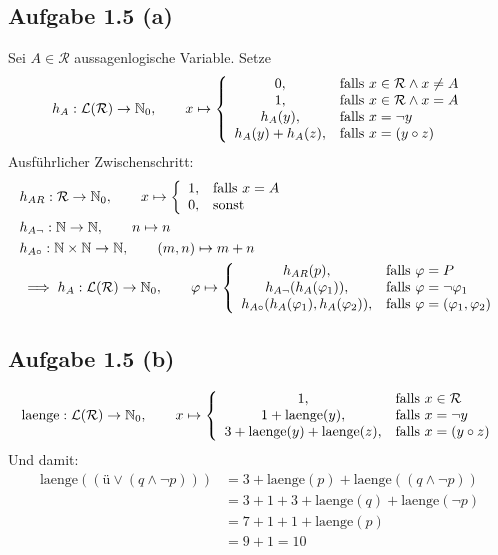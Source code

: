 \documentclass[12pt,a4paper]{article}
\begin{document}
\subsection*{Aufgabe 1.5 (a)}
Sei $A\in\mathcal{R}$ aussagenlogische Variable. Setze
\begin{align*}
h_A:\mathcal{L}(\mathcal{R})\to\mathbb{N}_0,\qquad x\mapsto \left\lbrace\begin{array}{cl}
0, & \text{falls } x\in\mathcal{R}\wedge x\neq A\\
1, & \text{falls } x\in\mathcal{R}\wedge x=A\\
h_A(y), & \text{falls } x=\neg y\\
h_A(y)+h_A(z), & \text{falls } x=(y\circ z)
\end{array}\right.
\end{align*}
Ausführlicher Zwischenschritt:
\begin{align*}
&h_{AR}:\mathcal{R}\to\mathbb{N}_0,\qquad x\mapsto \left\lbrace\begin{array}{cl}
1, & \text{falls } x= A\\
0, & \text{sonst }
\end{array}\right.\\
&h_{A\neg}:\mathbb{N}\to\mathbb{N},\qquad n\mapsto n\\
&h_{A\circ}:\mathbb{N}\times\mathbb{N}\to\mathbb{N},\qquad(m,n)\mapsto m+n\\
&\implies h_A:\mathcal{L}(\mathcal{R})\to\mathbb{N}_0,\qquad\varphi\mapsto
\left\lbrace\begin{array}{cl}
h_{AR}(p), & \text{falls } \varphi=P\\
h_{A\neg}(h_A(\varphi_1)), & \text{falls } \varphi=\neg\varphi_1\\
h_{A\circ}(h_A(\varphi_1),h_A(\varphi_2)), &\text{falls } \varphi=(\varphi_1,\varphi_2)
\end{array}\right.
\end{align*}

\subsection*{Aufgabe 1.5 (b)}
\begin{align*}
\text{laenge}:\mathcal{L}(\mathcal{R})\to\mathbb{N}_0,\qquad x\mapsto \left\lbrace\begin{array}{cl}
1, & \text{falls } x\in\mathcal{R}\\
1+\text{laenge}(y), & \text{falls } x=\neg y\\
3+\text{laenge}(y)+\text{laenge}(z), & \text{falls } x=(y\circ z)
\end{array}\right.
\end{align*}
Und damit:
\begin{align*}
\text{laenge}((ü\vee(q\wedge\neg p))) 
&=3+\text{laenge}(p)+\text{laenge}((q\wedge\neg p))\\
&=3+1+3+\text{laenge}(q)+\text{laenge}(\neg p)\\
&=7 + 1 + 1+ \text{laenge}(p)\\
&=9+1=10
\end{align*}
\end{document}
